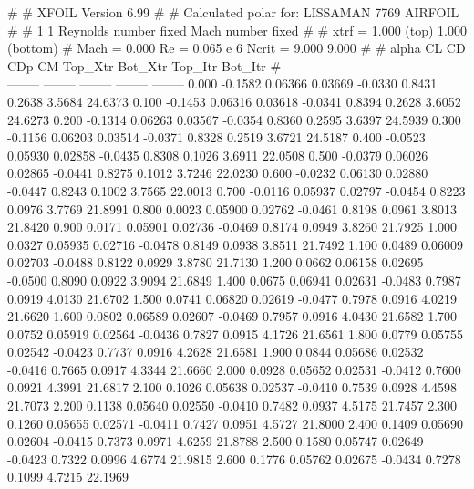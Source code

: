 #  
#       XFOIL         Version 6.99
#  
# Calculated polar for: LISSAMAN 7769 AIRFOIL                           
#  
# 1 1 Reynolds number fixed          Mach number fixed         
#  
# xtrf =   1.000 (top)        1.000 (bottom)  
# Mach =   0.000     Re =     0.065 e 6     Ncrit =   9.000  9.000
#  
#   alpha    CL        CD       CDp       CM     Top_Xtr  Bot_Xtr  Top_Itr  Bot_Itr
#  ------ -------- --------- --------- -------- -------- -------- -------- --------
   0.000  -0.1582   0.06366   0.03669  -0.0330   0.8431   0.2638   3.5684  24.6373
   0.100  -0.1453   0.06316   0.03618  -0.0341   0.8394   0.2628   3.6052  24.6273
   0.200  -0.1314   0.06263   0.03567  -0.0354   0.8360   0.2595   3.6397  24.5939
   0.300  -0.1156   0.06203   0.03514  -0.0371   0.8328   0.2519   3.6721  24.5187
   0.400  -0.0523   0.05930   0.02858  -0.0435   0.8308   0.1026   3.6911  22.0508
   0.500  -0.0379   0.06026   0.02865  -0.0441   0.8275   0.1012   3.7246  22.0230
   0.600  -0.0232   0.06130   0.02880  -0.0447   0.8243   0.1002   3.7565  22.0013
   0.700  -0.0116   0.05937   0.02797  -0.0454   0.8223   0.0976   3.7769  21.8991
   0.800   0.0023   0.05900   0.02762  -0.0461   0.8198   0.0961   3.8013  21.8420
   0.900   0.0171   0.05901   0.02736  -0.0469   0.8174   0.0949   3.8260  21.7925
   1.000   0.0327   0.05935   0.02716  -0.0478   0.8149   0.0938   3.8511  21.7492
   1.100   0.0489   0.06009   0.02703  -0.0488   0.8122   0.0929   3.8780  21.7130
   1.200   0.0662   0.06158   0.02695  -0.0500   0.8090   0.0922   3.9094  21.6849
   1.400   0.0675   0.06941   0.02631  -0.0483   0.7987   0.0919   4.0130  21.6702
   1.500   0.0741   0.06820   0.02619  -0.0477   0.7978   0.0916   4.0219  21.6620
   1.600   0.0802   0.06589   0.02607  -0.0469   0.7957   0.0916   4.0430  21.6582
   1.700   0.0752   0.05919   0.02564  -0.0436   0.7827   0.0915   4.1726  21.6561
   1.800   0.0779   0.05755   0.02542  -0.0423   0.7737   0.0916   4.2628  21.6581
   1.900   0.0844   0.05686   0.02532  -0.0416   0.7665   0.0917   4.3344  21.6660
   2.000   0.0928   0.05652   0.02531  -0.0412   0.7600   0.0921   4.3991  21.6817
   2.100   0.1026   0.05638   0.02537  -0.0410   0.7539   0.0928   4.4598  21.7073
   2.200   0.1138   0.05640   0.02550  -0.0410   0.7482   0.0937   4.5175  21.7457
   2.300   0.1260   0.05655   0.02571  -0.0411   0.7427   0.0951   4.5727  21.8000
   2.400   0.1409   0.05690   0.02604  -0.0415   0.7373   0.0971   4.6259  21.8788
   2.500   0.1580   0.05747   0.02649  -0.0423   0.7322   0.0996   4.6774  21.9815
   2.600   0.1776   0.05762   0.02675  -0.0434   0.7278   0.1099   4.7215  22.1969
